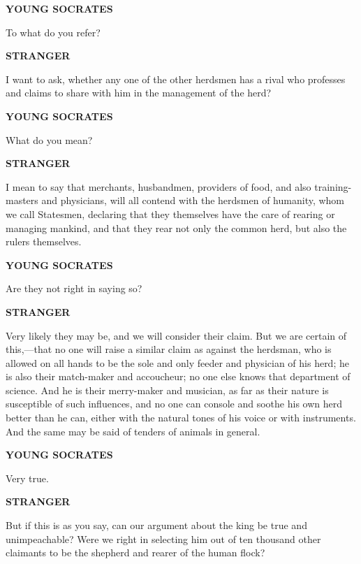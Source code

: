\documentclass[11pt,letter]{article}
\begin{document}
\par \textbf{YOUNG SOCRATES}
\par   To what do you refer?

\par \textbf{STRANGER}
\par   I want to ask, whether any one of the other herdsmen has a rival who professes and claims to share with him in the management of the herd?

\par \textbf{YOUNG SOCRATES}
\par   What do you mean?

\par \textbf{STRANGER}
\par   I mean to say that merchants, husbandmen, providers of food, and also training-masters and physicians, will all contend with the herdsmen of humanity, whom we call Statesmen, declaring that they themselves have the care of rearing or managing mankind, and that they rear not only the common herd, but also the rulers themselves.

\par \textbf{YOUNG SOCRATES}
\par   Are they not right in saying so?

\par \textbf{STRANGER}
\par   Very likely they may be, and we will consider their claim. But we are certain of this,—that no one will raise a similar claim as against the herdsman, who is allowed on all hands to be the sole and only feeder and physician of his herd; he is also their match-maker and accoucheur; no one else knows that department of science. And he is their merry-maker and musician, as far as their nature is susceptible of such influences, and no one can console and soothe his own herd better than he can, either with the natural tones of his voice or with instruments. And the same may be said of tenders of animals in general.

\par \textbf{YOUNG SOCRATES}
\par   Very true.

\par \textbf{STRANGER}
\par   But if this is as you say, can our argument about the king be true and unimpeachable? Were we right in selecting him out of ten thousand other claimants to be the shepherd and rearer of the human flock?
\end{document}
